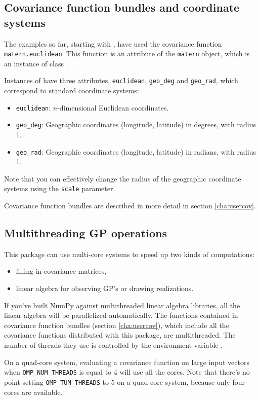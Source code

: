 \subsection{Covariance function bundles and coordinate systems}
The examples so far, starting with , have used the covariance function \texttt{matern.euclidean}. This function is an attribute of the \texttt{matern} object, which is an instance of class .

Instances of  have three attributes, \texttt{euclidean}, \texttt{geo_deg} and \texttt{geo_rad}, which correspond to standard coordinate systems:
\begin{itemize}
    \item \texttt{euclidean}: $n$-dimensional Euclidean coordinates.
    \item \texttt{geo_deg}: Geographic coordinates (longitude, latitude) in degrees, with radius 1.
    \item \texttt{geo_rad}: Geographic coordinates (longitude, latitude) in radians, with radius 1.
\end{itemize}
Note that you can effectively change the radius of the geographic coordinate systems using the \texttt{scale} parameter.

Covariance function bundles are described in more detail in section \ref{cha:usercov}.

\subsection{Multithreading GP operations}
This package can use multi-core systems to speed up two kinds of computations:
\begin{itemize}
	\item filling in covariance matrices,
	\item linear algebra for observing GP's or drawing realizations.
\end{itemize}
If you've built NumPy against multithreaded linear algebra libraries, all the linear algebra will be parallelized automatically. The functions contained in covariance function bundles (section \ref{cha:usercov}), which include all the covariance functions distributed with this package, are multithreaded. The number of threads they use is controlled by the environment variable . 

On a quad-core system, evaluating a covariance function on large input vectors when \texttt{OMP_NUM_THREADS} is equal to 4 will use all the cores. Note that there's no point setting \texttt{OMP_TUM_THREADS} to 5 on a quad-core system, because only four cores are available.


